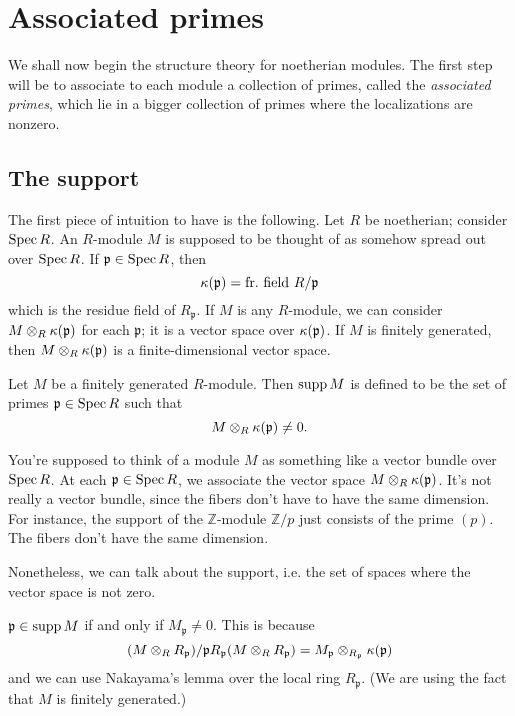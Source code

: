 \section{Associated primes}

We shall now begin the structure theory for noetherian modules. The first step
will be to associate to each module a collection of primes, called the
\emph{associated primes}, which lie in a bigger collection of primes where the
localizations are nonzero.

\subsection{The support}
The first piece of intuition to have is the following. Let $R$ be noetherian;
consider $\operatorname{Spec} R$. An $R$-module $M$ is supposed to be thought of as somehow
spread out over $\operatorname{Spec} R$. If $\mathfrak{p} \in \operatorname{Spec} R$, then 
\[ \kappa(\mathfrak{p}) = \mathrm{fr.  \ field \ } R/\mathfrak{p}  \]
which is the residue field of $R_{\mathfrak{p}}$. If $M$ is any $R$-module, we
can consider $M \otimes_R \kappa(\mathfrak{p})$ for each $\mathfrak{p}$; it is a
vector space over $\kappa(\mathfrak{p})$. If $M$ is finitely generated, then $M \otimes_R
\kappa(\mathfrak{p})$ is a finite-dimensional vector space.

\begin{definition} 
Let $M$ be a finitely generated $R$-module. Then $\operatorname{supp} M$ is defined to be the set of primes
$\mathfrak{p} \in \operatorname{Spec} R$ such that
\[ M \otimes_R \kappa(\mathfrak{p}) \neq 0.  \]
\end{definition} 

You're supposed to think of a module $M$ as something like a vector bundle over
$\operatorname{Spec} R$. At each $\mathfrak{p} \in \operatorname{Spec} R$, we associate the vector space $M
\otimes_R \kappa(\mathfrak{p})$. It's not really a vector bundle, since the fibers
don't have to have the same dimension. For instance, the support of the
$\mathbb{Z}$-module $\mathbb{Z}/p$ just consists of the prime $(p)$. The fibers
don't have the same dimension.

Nonetheless, we can talk about the support, i.e. the set of spaces where the
vector space is not zero.

\begin{remark} 
$\mathfrak{p} \in \operatorname{supp} M$ if and only if $M_{\mathfrak{p}} \neq 0$. This is
because
\[ (M \otimes_R R_{\mathfrak{p}})/ \mathfrak{p} R_{\mathfrak{p}} (M \otimes_R
R_{\mathfrak{p}})  = M_{\mathfrak{p}}
\otimes_{R_{\mathfrak{p}}} \kappa(\mathfrak{p})  \]
and we can use Nakayama's lemma over the local ring $R_{\mathfrak{p}}$.  (We
are using the fact that $M$ is finitely generated.)
\end{remark} 

